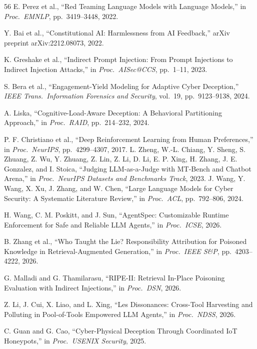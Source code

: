 \begin{thebibliography}{56}
 E. Perez et al., ``Red Teaming Language Models with Language Models,'' in \emph{Proc.\ EMNLP}, pp.~3419--3448, 2022.

 Y. Bai et al., ``Constitutional AI: Harmlessness from AI Feedback,'' arXiv preprint arXiv:2212.08073, 2022.

 K. Greshake et al., ``Indirect Prompt Injection: From Prompt Injections to Indirect Injection Attacks,'' in \emph{Proc.\ AISec@CCS}, pp.~1--11, 2023.

 S. Bera et al., ``Engagement-Yield Modeling for Adaptive Cyber Deception,'' \emph{IEEE Trans.\ Information Forensics and Security}, vol.~19, pp.~9123--9138, 2024.

 A. Liska, ``Cognitive-Load-Aware Deception: A Behavioral Partitioning Approach,'' in \emph{Proc.\ RAID}, pp.~214--232, 2024.

 P. F. Christiano et al., ``Deep Reinforcement Learning from Human Preferences,'' in \emph{Proc.\ NeurIPS}, pp.~4299--4307, 2017.
 L. Zheng, W.-L. Chiang, Y. Sheng, S. Zhuang, Z. Wu, Y. Zhuang, Z. Lin, Z. Li, D. Li, E. P. Xing, H. Zhang, J. E. Gonzalez, and I. Stoica, ``Judging LLM-as-a-Judge with MT-Bench and Chatbot Arena,'' in \emph{Proc.\ NeurIPS Datasets and Benchmarks Track}, 2023.
 J. Wang, Y. Wang, X. Xu, J. Zhang, and W. Chen, ``Large Language Models for Cyber Security: A Systematic Literature Review,'' in \emph{Proc.\ ACL}, pp.~792--806, 2024.

 H. Wang, C. M. Poskitt, and J. Sun, ``AgentSpec: Customizable Runtime Enforcement for Safe and Reliable LLM Agents,'' in \emph{Proc.\ ICSE}, 2026.

 B. Zhang et al., ``Who Taught the Lie? Responsibility Attribution for Poisoned Knowledge in Retrieval-Augmented Generation,'' in \emph{Proc.\ IEEE S\&P}, pp.~4203--4222, 2026.

 G. Malladi and G. Thamilarasu, ``RIPE-II: Retrieval In-Place Poisoning Evaluation with Indirect Injections,'' in \emph{Proc.\ DSN}, 2026.

 Z. Li, J. Cui, X. Liao, and L. Xing, ``Les Dissonances: Cross-Tool Harvesting and Polluting in Pool-of-Tools Empowered LLM Agents,'' in \emph{Proc.\ NDSS}, 2026.

 C. Guan and G. Cao, ``Cyber-Physical Deception Through Coordinated IoT Honeypots,'' in \emph{Proc.\ USENIX Security}, 2025.


\end{thebibliography}
